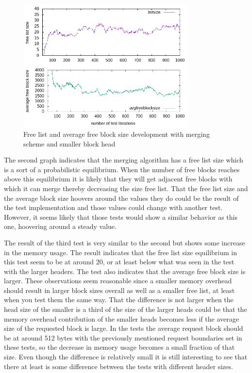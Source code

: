 \documentclass{article}
\begin{document}
 \begin{figure}[h!]
    \centering
    \includegraphics[width=0.8\textwidth]{smallMerge.png}
    \caption{Free list and average free block size development with merging scheme and smaller block head}
    \label{fig:smallMerge}
\end{figure}

 The second graph indicates that the merging algorithm has a free list size which is a sort of a probabilistic equilibrium. 
 When the number of free blocks reaches above this equilibrium it is likely that they will get adjacent free blocks with which it can merge thereby 
decreasing the size free list. That the free list size and the average block size hoovers around
the values they do could be the result of the test implementation and those values could change with another test. However, 
it seems likely that those tests would show a similar behavior as this one, hoovering around a steady value. 

The result of the third test is very similar to the second but shows some increase in the memory usage. The result 
indicates that the free list size equilibrium in this test seem to be at around 20, or at least below what was seen in 
the test with the larger headers. The test also indicates that the average free block size is larger. These observations 
seem reasonable since a smaller memory overhead should result in larger block sizes overall as well as a smaller free list,
 at least when you test them the same way. That the difference is not larger when the head size of the smaller is a 
 third of the size of the larger heads could be that the memory overhead contribution of the smaller heads becomes less if the average size 
 of the requested block is large. In the tests the average request block should be at around 512 bytes with the previously mentioned request 
 boundaries set in these tests, so the decrease in memory usage becomes a small fraction of that size. Even though the difference is relatively small 
 it is still interesting to see that there at least is some difference between the tests with different header sizes. 
    
\end{document}
